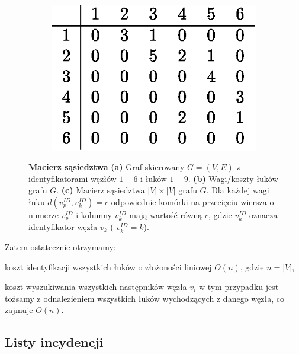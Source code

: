 \begin{figure}[!htbp]
\begin{subfigure}[b]{0.09\textwidth}
		\caption{}
	\end{subfigure}
	\qquad
	\begin{subfigure}[b]{0.35\textwidth}
		\includegraphics[width=\textwidth]{Chapter_I/2/1_2c.eps}
		\caption{}
	\end{subfigure}
	\caption{\textbf{Macierz sąsiedztwa} \textbf{(a)} Graf skierowany $G = \left( V, E \right)$ z identyfikatorami węzłów $1-6$ i łuków $1-9$. \textbf{(b)} Wagi/koszty łuków grafu $G$. \textbf{(c)} Macierz sąsiedztwa $ \left| V \right| \times \left| V \right| $ grafu $G$. Dla każdej wagi łuku $ d \left( v_{p}^{ID}, v_{k}^{ID} \right) = c$ odpowiednie komórki na przecięciu wiersza o numerze $v_{p}^{ID}$ i kolumny $v_{k}^{ID}$ mają wartość równą $c$, gdzie $v_{k}^{ID}$ oznacza identyfikator węzła $v_{k}$ ( $v_{k}^{ID} = k$).}\label{fig:adjacencyMatrix}
\end{figure}

Zatem ostatecznie otrzymamy:

\begin{myitemize}
	\item koszt identyfikacji wszystkich łuków o złożoności liniowej $O \left( n \right)$, gdzie $ n = \left| V \right| $,
	\item koszt wyszukiwania wszystkich następników węzła $v_{i}$ w tym przypadku jest tożsamy z odnalezieniem wszystkich łuków wychodzących z danego węzła, co zajmuje $O \left( n \right)$.
\end{myitemize}

\subsection{Listy incydencji}

